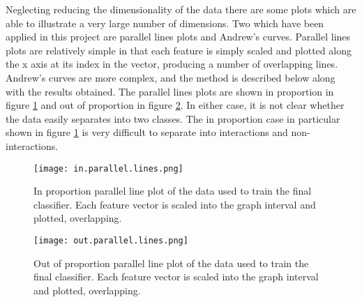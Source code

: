 Neglecting reducing the dimensionality of the data there are some plots which are able to illustrate a very large number of dimensions.
Two which have been applied in this project are parallel lines plots and Andrew's curves\autocite{andrews_plots_1972}.
Parallel lines plots are relatively simple in that each feature is simply scaled and plotted along the x axis at its index in the vector, producing a number of overlapping lines.
Andrew's curves are more complex, and the method is described below along with the results obtained.
The parallel lines plots are shown in proportion in figure \ref{fig:inparline} and out of proportion in figure \ref{fig:outparline}.
In either case, it is not clear whether the data easily separates into two classes.
The in proportion case in particular shown in figure \ref{fig:inparline} is very difficult to separate into interactions and non-interactions.

\begin{figure}
    \texttt{[image: in.parallel.lines.png]}
    \centering
    \caption{In proportion parallel line plot of the data used to train the final classifier. Each feature vector is scaled into the graph interval and plotted, overlapping.}
    \label{fig:inparline}
\end{figure}

\begin{figure}
    \texttt{[image: out.parallel.lines.png]}   
    \centering
    \caption{Out of proportion parallel line plot of the data used to train the final classifier. Each feature vector is scaled into the graph interval and plotted, overlapping.}
    \label{fig:outparline}
\end{figure}

